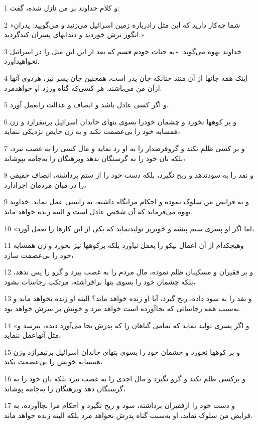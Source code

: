 \par 1 و کلام خداوند بر من نازل شده، گفت:
\par 2 «شما چه‌کار دارید که این مثل رادرباره زمین اسرائیل می‌زنید و می‌گویید: پدران انگور ترش خوردند و دندانهای پسران کندگردید.»
\par 3 خداوند یهوه می‌گوید: «به حیات خودم قسم که بعد از این این مثل را در اسرائیل نخواهیدآورد.
\par 4 اینک همه جانها از آن منند چنانکه جان پدر است، همچنین جان پسر نیز، هردوی آنها ازآن من می‌باشند. هر کسی‌که گناه ورزد او خواهدمرد.
\par 5 و اگر کسی عادل باشد و انصاف و عدالت رابعمل آورد،
\par 6 و بر کوهها نخورد و چشمان خودرا بسوی بتهای خاندان اسرائیل برنیفرازد و زن همسایه خود را بی‌عصمت نکند و به زن حایض نزدیکی ننماید،
\par 7 و بر کسی ظلم نکند و گروقرضدار را به او رد نماید و مال کسی را به غصب نبرد، بلکه نان خود را به گرسنگان بدهد وبرهنگان را به‌جامه بپوشاند،
\par 8 و نقد را به سودندهد و ربح نگیرد، بلکه دست خود را از ستم برداشته، انصاف حقیقی را در میان مردمان اجرادارد،
\par 9 و به فرایض من سلوک نموده و احکام مرانگاه داشته، به راستی عمل نماید. خداوند یهوه می‌فرماید که آن شخص عادل است و البته زنده خواهد ماند.
\par 10 «اما اگر او پسری ستم پیشه و خونریز تولیدنماید که یکی از این کارها را بعمل آورد،
\par 11 وهیچکدام از آن اعمال نیکو را بعمل نیاورد بلکه برکوهها نیز بخورد و زن همسایه خود را بی‌عصمت سازد،
\par 12 و بر فقیران و مسکینان ظلم نموده، مال مردم را به غصب ببرد و گرو را پس ندهد، بلکه چشمان خود را بسوی بتها برافراشته، مرتکب رجاسات بشود،
\par 13 و نقد را به سود داده، ربح گیرد، آیا او زنده خواهد ماند؟ البته او زنده نخواهد ماند و به‌سبب همه رجاساتی که بجاآورده است خواهد مرد و خونش بر سرش خواهد بود.
\par 14 «و اگر پسری تولید نماید که تمامی گناهان را که پدرش بجا می‌آورد دیده، بترسد و مثل آنهاعمل ننماید،
\par 15 و بر کوهها نخورد و چشمان خود را بسوی بتهای خاندان اسرائیل برنیفرازد وزن همسایه خویش را بی‌عصمت نکند،
\par 16 و برکسی ظلم نکند و گرو نگیرد و مال احدی را به غصب نبرد بلکه نان خود را به گرسنگان دهد وبرهنگان را به‌جامه پوشاند،
\par 17 و دست خود را ازفقیران برداشته، سود و ربح نگیرد و احکام مرا بجاآورده، به فرایض من سلوک نماید، او به‌سبب گناه پدرش نخواهد مرد بلکه البته زنده خواهد ماند.
